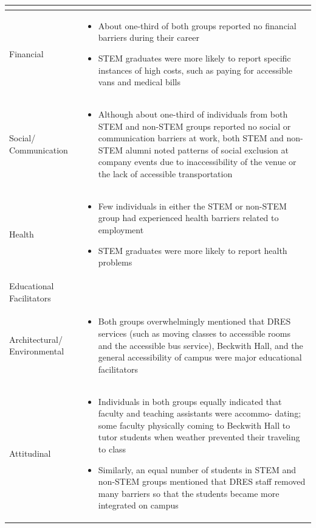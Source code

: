 \documentclass[11.5pt]{sig-alternate} %
\begin{document}
\begin{large}
\begin{table}[thp]
\begin{tabular}{|l|l|}
\begin{itemize}[noitemsep, topsep=0pt, leftmargin=*]
\end{itemize} \\ \hline
Financial &
\begin{itemize}[noitemsep, topsep=0pt, leftmargin=*]
\item About one-third of both groups reported no financial barriers during their career
\item STEM graduates were more likely to report specific instances of high costs, such as paying for accessible vans and medical bills
\end{itemize} \\ \hline
Social/ Communication &
\begin{itemize}[noitemsep, topsep=0pt, leftmargin=*]
\item Although about one-third of individuals from both STEM and non-STEM groups reported no social or communication barriers at work, both STEM and non-STEM alumni noted patterns of social exclusion at company events due to inaccessibility of the venue or the lack of accessible transportation
\end{itemize} \\ \hline
Health &
\begin{itemize}[noitemsep, topsep=0pt, leftmargin=*]
\item Few individuals in either the STEM or non-STEM group had experienced health barriers related to employment
\item STEM graduates were more likely to report health problems
\end{itemize} \\ \hline
%
Educational Facilitators & \\ \hline
Architectural/ Environmental & 
\begin{itemize}[noitemsep, topsep=0pt, leftmargin=*]
\item Both groups overwhelmingly mentioned that DRES services (such as moving classes to accessible rooms and the accessible bus service), Beckwith Hall, and the general accessibility of campus were major educational facilitators
\end{itemize} \\ \hline
Attitudinal &
\begin{itemize}[noitemsep, topsep=0pt, leftmargin=*]
\item Individuals in both groups equally indicated that faculty and teaching assistants were accommo- dating; some faculty physically coming to Beckwith Hall to tutor students when weather prevented their traveling to class
\item Similarly, an equal number of students in STEM and non-STEM groups mentioned that DRES staff removed many barriers so that the students became more integrated on campus

\end{itemize}
\end{tabular}
\end{table}
\end{large}
\end{document}
